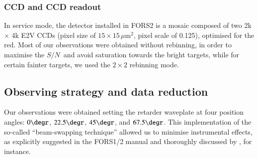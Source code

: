 \documentclass[a4paper]{aa}
\newcommand{\snr}{\ensuremath{S/N}}
\begin{document}
\subsubsection{CCD and CCD readout}
In service mode, the detector installed in FORS2 is a mosaic composed
of two 2k $\times$ 4k E2V CCDs (pixel size of $15 \times 15\,\mu$m$^2$,
pixel scale of 0.125\arcsec), optimised for the red. Most of our
observations were obtained without rebinning, in order to maximise the
\snr\ and avoid saturation towards the bright targets, while for certain
fainter targets, we used the $2\times2$ rebinning mode. 

\subsection{Observing strategy and data reduction}
Our observations were obtained setting the retarder waveplate at four
position angles: $0\degr$, $22.5\degr$, $45\degr$, and $67.5\degr$. This
implementation of the so-called ``beam-swapping technique'' allowed
us to minimise instrumental effects, as explicitly suggested in the
FORS1/2 manual and thoroughly discussed by \citet{Bagetal09},
for instance.
\end{document}
